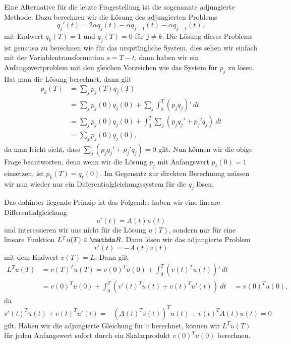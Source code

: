 Eine Alternative für die letzte Fragestellung ist die sogenannte adjungierte Methode. Dazu berechnen wir die Lösung des adjungierten Problems
$$  q_j'(t) = 2\alpha q_j(t) - \alpha q_{j+1}(t) - \alpha q_{j-1}(t), $$
mit Endwert $q_k(T) = 1$ und $q_j(T) = 0$ für $j\neq k$. Die Lösung dieses Problems ist genauso zu berechnen wie für das ursprüngliche System, dies sehen wir einfach mit der Variablentransformation $s=T-t$, dann haben wir ein Anfangswertproblem mit den gleichen Vorzeichen wie das System für $p_j$ zu lösen. Hat man die Lösung berechnet, dann gilt
\begin{align*} p_k(T) &= \sum_j p_j(T) q_j(T) \\
&= \sum_j p_j(0) q_j(0) +\sum_j \int_0^T (p_j q_j)'~dt \\
&= \sum_j p_j(0) q_j(0) + \int_0^T \sum_j (p_j q_j' + p_j' q_j)~dt \\ &= \sum_j p_j(0) q_j(0),
\end{align*}
da man leicht sieht, dass $\sum_j (p_j q_j' + p_j' q_j) = 0$ gilt. Nun können wir die obige Frage beantworten, denn wenn wir die Lösung $p_j$ mit Anfangswert $p_\ell(0)=1$ einsetzen, ist $p_k(T) = q_\ell(0)$. Im Gegensatz zur direkten Berechnung müssen wir nun wieder nur ein Differentialgleichungssystem für die $q_j$ lösen. 

Das dahinter liegende Prinzip ist das Folgende: haben wir eine lineare Differentialgleichung
$$ u'(t) = A(t) u(t)$$
und interessieren wir uns nicht für die Lösung $u(T)$, sondern nur für eine lineare Funktion $L^T u(T) \in \R$. Dann lösen wir das adjungierte Problem 
$$ v'(t) = - A(t) v(t)$$
mit dem Endwert $v(T) = L$. Dann gilt
\begin{align*} L^T u(T) &= v(T)^T u(T) = v(0)^T u(0) + \int_0^T (v(t)^T u(t))'~dt \\
&= v(0)^T u(0) + \int_0^T (v'(t)^T u(t) + v(t)^T u'(t))~dt
&=  v(0)^T u(0), \end{align*}
da $v'(t)^T u(t) + v(t)^T u'(t) = - (A(t)^T v(t))^T u(t) + v(t)^T A(t) u(t) =0$ gilt. Haben wir die adjungierte Gleichung für $v$ berechnet, können wir $L^T u(T)$ für jeden Anfangswert sofort durch ein Skalarprodukt $v(0)^T u(0)$ berechnen. 

